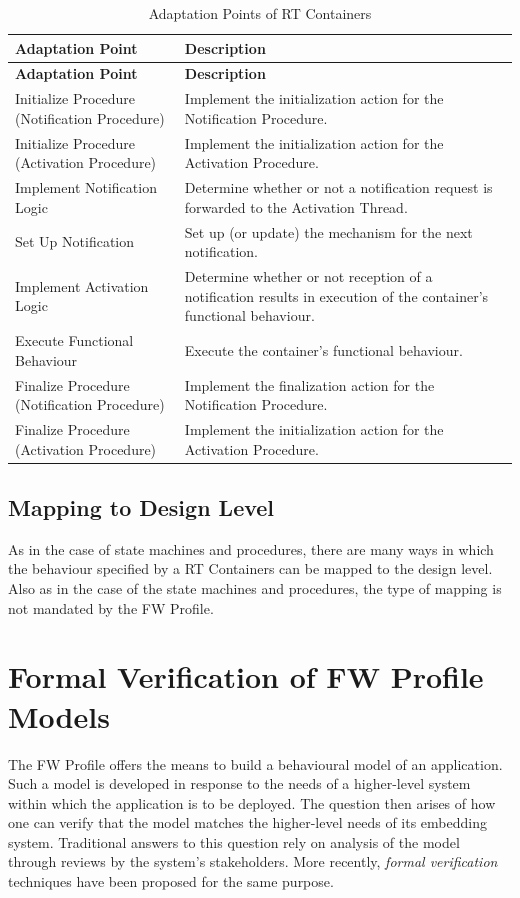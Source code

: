 \documentclass[definition]{../fwprofile}
\begin{document}
\begin{longtable}{|>{\raggedright\arraybackslash}p{3.9cm}|p{7.3cm}|}
\caption{Adaptation Points of RT Containers} \label{tab:rtAdaptPoints}\\
\hline
\rowcolor{lightblue}
\textbf{Adaptation Point} & \textbf{Description} \\
\hline\hline
\endfirsthead
\rowcolor{lightblue}
\textbf{Adaptation Point} & \textbf{Description} \\
\hline\hline
\endhead
Initialize Procedure (Notification Procedure) & Implement the initialization action for the Notification Procedure. \\
\hline
Initialize Procedure (Activation Procedure) & Implement the initialization action for the Activation Procedure. \\
\hline
Implement Notification Logic & Determine whether or not a notification request is forwarded to the Activation Thread. \\
\hline
Set Up Notification & Set up (or update) the mechanism for the next notification. \\
\hline
Implement Activation Logic & Determine whether or not reception of a notification results in execution of the container's functional behaviour. \\
\hline
Execute Functional Behaviour & Execute the container's functional behaviour. \\
\hline
Finalize Procedure (Notification Procedure) & Implement the finalization action for the Notification Procedure. \\
\hline
Finalize Procedure (Activation Procedure) & Implement the initialization action for the Activation Procedure. \\
\hline
\end{longtable}

\subsection{Mapping to Design Level}
As in the case of state machines and procedures, there are many ways in which the behaviour
specified by a RT Containers can be mapped to the design level. Also as in the case of the state machines and procedures, the type of mapping is not mandated by the FW Profile.

\section{Formal Verification of FW Profile Models}\label{sec:formalVerification}
The FW Profile offers the means to build a behavioural model of an application. Such a model is developed in response to the needs of a higher-level system within which the application is to be deployed. The question then arises of how one can verify that the model matches the higher-level needs of its embedding system. Traditional answers to this question rely on analysis of the model through reviews by the system's stakeholders. More recently, \textit{formal verification} techniques have been proposed for the same purpose.
\end{document}
